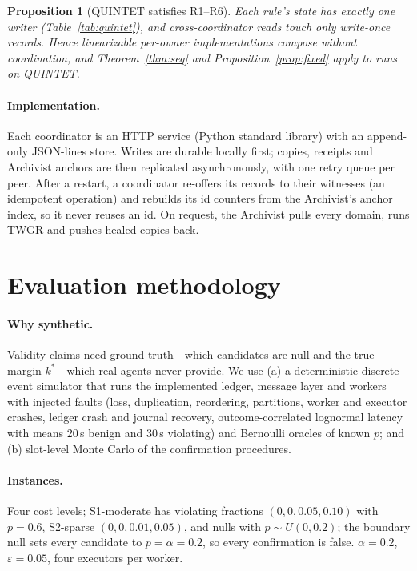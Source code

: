 \documentclass[11pt]{article}
\newtheorem{proposition}[theorem]{Proposition}
\theoremstyle{definition}
\begin{document}
\begin{proposition}[QUINTET satisfies R1--R6]\label{prop:quintet}
Each rule's state has exactly one writer (Table~\ref{tab:quintet}), and cross-coordinator reads touch only write-once records. Hence linearizable per-owner implementations compose without coordination, and Theorem~\ref{thm:seq} and Proposition~\ref{prop:fixed} apply to runs on QUINTET.
\end{proposition}

\paragraph{Implementation.} Each coordinator is an HTTP service (Python standard library) with an append-only JSON-lines store. Writes are durable locally first; copies, receipts and Archivist anchors are then replicated asynchronously, with one retry queue per peer. After a restart, a coordinator re-offers its records to their witnesses (an idempotent operation) and rebuilds its id counters from the Archivist's anchor index, so it never reuses an id. On request, the Archivist pulls every domain, runs TWGR and pushes healed copies back.

\section{Evaluation methodology}\label{sec:method}

\paragraph{Why synthetic.} Validity claims need ground truth---which candidates are null and the true margin $k^*$---which real agents never provide. We use (a) a deterministic discrete-event simulator that runs the implemented ledger, message layer and workers with injected faults (loss, duplication, reordering, partitions, worker and executor crashes, ledger crash and journal recovery, outcome-correlated lognormal latency with means 20\,s benign and 30\,s violating) and Bernoulli oracles of known $p$; and (b) slot-level Monte Carlo of the confirmation procedures.

\paragraph{Instances.} Four cost levels; S1-moderate has violating fractions $(0,0,0.05,0.10)$ with $p=0.6$, S2-sparse $(0,0,0.01,0.05)$, and nulls with $p\sim U(0,0.2)$; the boundary null sets every candidate to $p=\alpha=0.2$, so every confirmation is false. $\alpha=0.2$, $\varepsilon=0.05$, four executors per worker.
\end{document}
